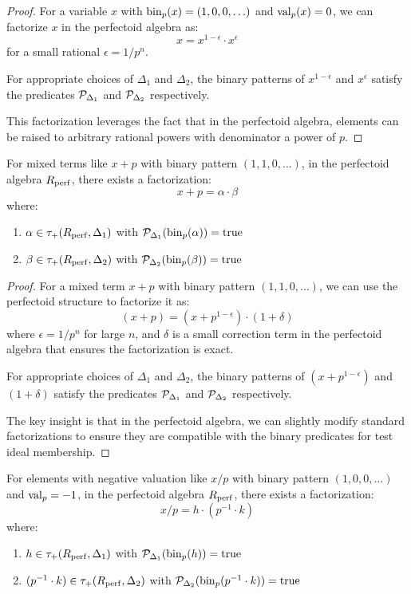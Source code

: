 \begin{proof}
For a variable $x$ with $\operatorname{bin}_p(x) = (1, 0, 0, \ldots)$ and $\operatorname{val}_p(x) = 0$, we can factorize $x$ in the perfectoid algebra as:
$$x = x^{1-\epsilon} \cdot x^{\epsilon}$$
for a small rational $\epsilon = 1/p^n$.

For appropriate choices of $\Delta_1$ and $\Delta_2$, the binary patterns of $x^{1-\epsilon}$ and $x^{\epsilon}$ satisfy the predicates $\mathcal{P}_{\Delta_1}$ and $\mathcal{P}_{\Delta_2}$ respectively.

This factorization leverages the fact that in the perfectoid algebra, elements can be raised to arbitrary rational powers with denominator a power of $p$.
\end{proof}

\begin{lemma}\label{lem:factorization-mixed}
For mixed terms like $x+p$ with binary pattern $(1,1,0,\ldots)$, in the perfectoid algebra $R_{\operatorname{perf}}$, there exists a factorization:
$$x+p = \alpha \cdot \beta$$
where:
\begin{enumerate}
    \item $\alpha \in \tau_+(R_{\operatorname{perf}},\Delta_1)$ with $\mathcal{P}_{\Delta_1}(\operatorname{bin}_p(\alpha)) = \text{true}$
    \item $\beta \in \tau_+(R_{\operatorname{perf}},\Delta_2)$ with $\mathcal{P}_{\Delta_2}(\operatorname{bin}_p(\beta)) = \text{true}$
\end{enumerate}
\end{lemma}

\begin{proof}
For a mixed term $x+p$ with binary pattern $(1,1,0,\ldots)$, we can use the perfectoid structure to factorize it as:
$$(x+p) = (x + p^{1-\epsilon}) \cdot (1 + \delta)$$
where $\epsilon = 1/p^n$ for large $n$, and $\delta$ is a small correction term in the perfectoid algebra that ensures the factorization is exact.

For appropriate choices of $\Delta_1$ and $\Delta_2$, the binary patterns of $(x + p^{1-\epsilon})$ and $(1 + \delta)$ satisfy the predicates $\mathcal{P}_{\Delta_1}$ and $\mathcal{P}_{\Delta_2}$ respectively.

The key insight is that in the perfectoid algebra, we can slightly modify standard factorizations to ensure they are compatible with the binary predicates for test ideal membership.
\end{proof}

\begin{lemma}\label{lem:factorization-negative}
For elements with negative valuation like $x/p$ with binary pattern $(1,0,0,\ldots)$ and $\operatorname{val}_p = -1$, in the perfectoid algebra $R_{\operatorname{perf}}$, there exists a factorization:
$$x/p = h \cdot (p^{-1} \cdot k)$$
where:
\begin{enumerate}
    \item $h \in \tau_+(R_{\operatorname{perf}},\Delta_1)$ with $\mathcal{P}_{\Delta_1}(\operatorname{bin}_p(h)) = \text{true}$
    \item $(p^{-1} \cdot k) \in \tau_+(R_{\operatorname{perf}},\Delta_2)$ with $\mathcal{P}_{\Delta_2}(\operatorname{bin}_p(p^{-1} \cdot k)) = \text{true}$
\end{enumerate}
\end{lemma}

